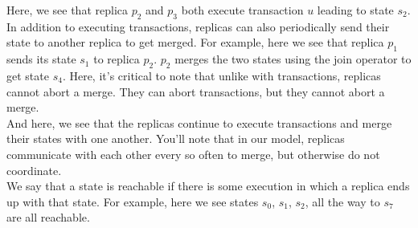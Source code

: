 \begin{frame}
{    Here, we see that replica $p_2$ and $p_3$ both execute transaction $u$
    leading to state $s_2$. \\[12pt]

    In addition to executing transactions, replicas can also periodically send
    their state to another replica to get merged. For example, here we see that
    replica $p_1$ sends its state $s_1$ to replica $p_2$. $p_2$ merges the two
    states using the join operator to get state $s_4$. Here, it's critical to
    note that unlike with transactions, replicas cannot abort a merge. They
    can abort transactions, but they cannot abort a merge. \\[12pt]

    And here, we see that the replicas continue to execute transactions and
    merge their states with one another. You'll note that in our model,
    replicas communicate with each other every so often to merge, but otherwise
    do not coordinate. \\[12pt]

    We say that a state is reachable if there is some execution in which a
    replica ends up with that state. For example, here we see states $s_0$,
    $s_1$, $s_2$, all the way to $s_7$ are all reachable.

  }
\end{frame}

